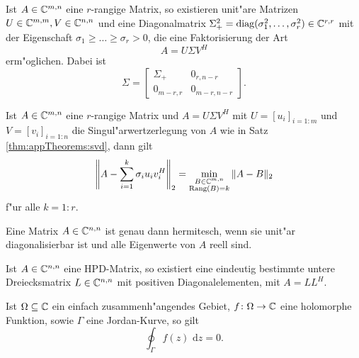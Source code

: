\begin{thm}\label{thm:appTheorems:svd}
Ist $A\in\mathbb{C}^{m,n}$ eine $r$-rangige Matrix, so existieren unit"are Matrizen $U\in\mathbb{C}^{m,m}, V\in\mathbb{C}^{n,n}$
und eine Diagonalmatrix $\Sigma^2_+ =\text{diag}(\sigma^2_1,\ldots,\sigma^2_r)\in\mathbb{C}^{r,r}$ mit der Eigenschaft $\sigma_1 \ge \ldots \ge \sigma_r > 0$, die
eine Faktorisierung der Art
\[
A = U \Sigma V^H
\]
erm"oglichen. Dabei ist
\[
\Sigma = \begin{bmatrix} \Sigma_+ & 0_{r,n-r} \\
0_{m-r,r} & 0_{m-r,n-r} \end{bmatrix}.
\]
\end{thm}

\begin{thm}\label{thm:appTheorems:rang}
Ist $A\in\mathbb{C}^{m,n}$ eine $r$-rangige Matrix und $A = U\Sigma V^H$ mit $U=[u_i]_{i=1:m}$ und $V=[v_i]_{i=1:n}$ die Singul"arwertzerlegung von $A$ wie in Satz \ref{thm:appTheorems:svd}, dann gilt
\[
\left\|A-\sum_{i=1}^k \sigma_i u_i v_i^H\right\|_2 = \min_{\substack{B\in\mathbb{C}^{m,n} \\ \text{Rang}(B)=k}} \|A-B\|_2
\]
f"ur alle $k=1:r$.
\end{thm}

\begin{thm}\label{thm:appTheorems:Spektralsatz}
Eine Matrix $A\in\mathbb{C}^{n,n}$ ist genau dann hermitesch, wenn sie unit"ar diagonalisierbar ist und alle Eigenwerte von $A$ reell sind.
\end{thm}

\begin{thm}\label{thm:appTheorems:Cholesky}
Ist $A\in\mathbb{C}^{n,n}$ eine HPD-Matrix, so existiert eine eindeutig bestimmte untere Dreiecksmatrix $L\in\mathbb{C}^{n,n}$ mit positiven Diagonalelementen, mit $A=LL^H$.
\end{thm}


\begin{thm}\label{thm:appTheorems:Cauchy}
Ist $\Omega\subseteq\mathbb{C}$ ein einfach zusammenh"angendes Gebiet, $f\colon\Omega\to\mathbb{C}$ eine holomorphe Funktion, sowie $\Gamma$ eine Jordan-Kurve, so gilt
\[
\oint_\Gamma f(z) \text{ d}z = 0.
\]
\end{thm}

